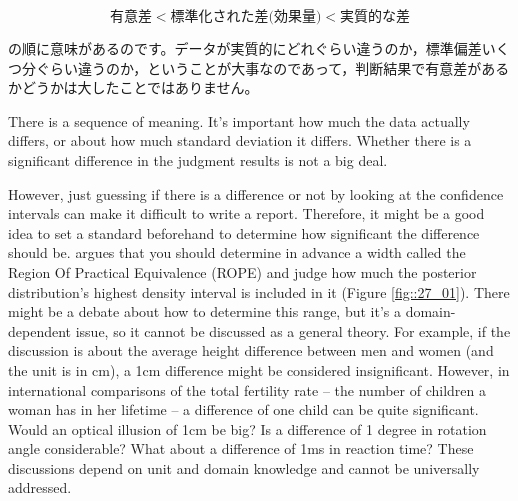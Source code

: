 \documentclass{ltjbook}
\begin{document}
\[ \mbox{有意差} < \mbox{標準化された差(効果量)} < \mbox{実質的な差} \]

の順に意味があるのです。データが実質的にどれぐらい違うのか，標準偏差いくつ分ぐらい違うのか，ということが大事なのであって，判断結果で有意差があるかどうかは大したことではありません。

There is a sequence of meaning. It's important how much the data actually differs, or about how much standard deviation it differs. Whether there is a significant difference in the judgment results is not a big deal.

However, just guessing if there is a difference or not by looking at the confidence intervals can make it difficult to write a report. Therefore, it might be a good idea to set a standard beforehand to determine how significant the difference should be.
\textcite{kruschke2018rejecting} argues that you should determine in advance a width called the Region Of Practical Equivalence (ROPE) and judge how much the posterior distribution's highest density interval is included in it (Figure \ref{fig::27_01}). There might be a debate about how to determine this range, but it's a domain-dependent issue, so it cannot be discussed as a general theory. For example, if the discussion is about the average height difference between men and women (and the unit is in cm), a 1cm difference might be considered insignificant. However, in international comparisons of the total fertility rate – the number of children a woman has in her lifetime – a difference of one child can be quite significant. Would an optical illusion of 1cm be big? Is a difference of 1 degree in rotation angle considerable? What about a difference of 1ms in reaction time? These discussions depend on unit and domain knowledge and cannot be universally addressed.
\end{document}
